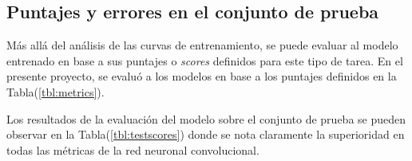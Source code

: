     \subsection{Puntajes y errores en el conjunto de prueba}\label{sec:scores}
    Más allá del análisis de las curvas de entrenamiento, se puede evaluar al modelo entrenado en base a sus puntajes o 
    \textit{scores} definidos para este tipo de tarea. En el presente proyecto, se evaluó a los modelos en base a 
    los puntajes definidos en la Tabla(\ref{tbl:metrics}).


    \begin{table}[!h]
        \centering
        \caption{Métricas para la evaluación del modelo}
        \label{tbl:metrics}
    \end{table}

    Los resultados de la evaluación del modelo sobre el conjunto de prueba se pueden observar en la Tabla(\ref{tbl:testscores}) donde se 
    nota claramente la superioridad en todas las métricas de la red neuronal convolucional. 

    \begin{table}[!h]
        \centering
        \caption{Evaluación de puntajes sobre el conjunto de prueba}
        \label{tbl:testscores}
    \end{table}

